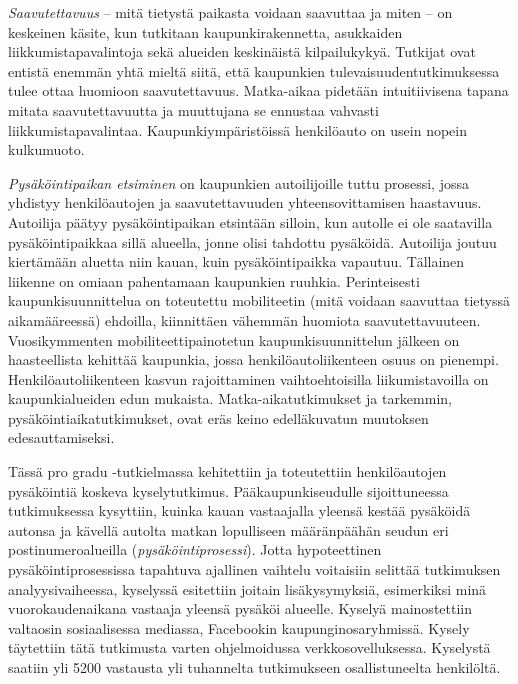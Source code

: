 \justify
\textit{Saavutettavuus} -- mitä tietystä paikasta voidaan saavuttaa ja miten -- on keskeinen käsite, kun tutkitaan kaupunkirakennetta, asukkaiden liikkumistapavalintoja sekä alueiden keskinäistä kilpailukykyä. Tutkijat ovat entistä enemmän yhtä mieltä siitä, että kaupunkien tulevaisuudentutkimuksessa tulee ottaa huomioon saavutettavuus. Matka-aikaa pidetään intuitiivisena tapana mitata saavutettavuutta ja muuttujana se ennustaa vahvasti liikkumistapavalintaa. Kaupunkiympäristöissä henkilöauto on usein nopein kulkumuoto.

\textit{Pysäköintipaikan etsiminen} on kaupunkien autoilijoille tuttu prosessi, jossa yhdistyy henkilöautojen ja saavutettavuuden yhteensovittamisen haastavuus. Autoilija päätyy pysäköintipaikan etsintään silloin, kun autolle ei ole saatavilla pysäköintipaikkaa sillä alueella, jonne olisi tahdottu pysäköidä. Autoilija joutuu kiertämään aluetta niin kauan, kuin pysäköintipaikka vapautuu. Tällainen liikenne on omiaan pahentamaan kaupunkien ruuhkia. Perinteisesti kaupunkisuunnittelua on toteutettu mobiliteetin (mitä voidaan saavuttaa tietyssä aikamääreessä) ehdoilla, kiinnittäen vähemmän huomiota saavutettavuuteen. Vuosikymmenten mobiliteettipainotetun kaupunkisuunnittelun jälkeen on haasteellista kehittää kaupunkia, jossa henkilöautoliikenteen osuus on pienempi. Henkilöautoliikenteen kasvun rajoittaminen vaihtoehtoisilla liikumistavoilla on kaupunkialueiden edun mukaista. Matka-aikatutkimukset ja tarkemmin, pysäköintiaikatutkimukset, ovat eräs keino edelläkuvatun muutoksen edesauttamiseksi.

Tässä pro gradu -tutkielmassa kehitettiin ja toteutettiin henkilöautojen pysäköintiä koskeva kyselytutkimus. Pääkaupunkiseudulle sijoittuneessa tutkimuksessa kysyttiin, kuinka kauan vastaajalla yleensä kestää pysäköidä autonsa ja kävellä autolta matkan lopulliseen määränpäähän seudun eri postinumeroalueilla (\textit{pysäköintiprosessi}). Jotta hypoteettinen pysäköintiprosessissa tapahtuva ajallinen vaihtelu voitaisiin selittää tutkimuksen analyysivaiheessa, kyselyssä esitettiin joitain lisäkysymyksiä, esimerkiksi minä vuorokaudenaikana vastaaja yleensä pysäköi alueelle. Kyselyä mainostettiin valtaosin sosiaalisessa mediassa, Facebookin kaupunginosaryhmissä. Kysely täytettiin tätä tutkimusta varten ohjelmoidussa verkkosovelluksessa. Kyselystä saatiin yli 5200 vastausta yli tuhannelta tutkimukseen osallistuneelta henkilöltä.

